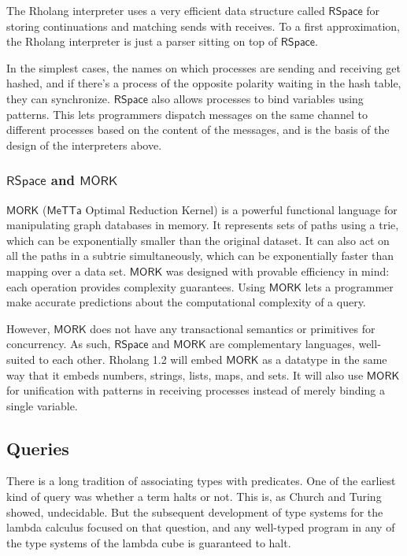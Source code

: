 \documentclass{article}
\newcommand{\RS}{\mathsf{RSpace}}
\begin{document}
The Rholang interpreter uses a very efficient data structure called $\RS$ for storing continuations and matching sends with receives.  To a first approximation, the Rholang interpreter is just a parser sitting on top of $\RS$.

In the simplest cases, the names on which processes are sending and receiving get hashed, and if there's a process of the opposite polarity waiting in the hash table, they can synchronize.  $\RS$ also allows processes to bind variables using patterns.  This lets programmers dispatch messages on the same channel to different processes based on the content of the messages, and is the basis of the design of the interpreters above.

\subsubsection{$\RS$ and $\mathsf{MORK}$}

$\mathsf{MORK}$ ($\mathsf{MeTTa}$ Optimal Reduction Kernel) is a powerful functional language for manipulating graph databases in memory. It represents sets of paths using a trie, which can be exponentially smaller than the original dataset.  It can also act on all the paths in a subtrie simultaneously, which can be exponentially faster than mapping over a data set.  $\mathsf{MORK}$ was designed with provable efficiency in mind: each operation provides complexity guarantees.  Using $\mathsf{MORK}$ lets a programmer make accurate predictions about the computational complexity of a query.

However, $\mathsf{MORK}$ does not have any transactional semantics or primitives for concurrency.  As such, $\RS$ and $\mathsf{MORK}$ are complementary languages, well-suited to each other.  Rholang 1.2 will embed $\mathsf{MORK}$ as a datatype in the same way that it embeds numbers, strings, lists, maps, and sets.  It will also use $\mathsf{MORK}$ for unification with patterns in receiving processes instead of merely binding a single variable.

\subsection{Queries}
\label{Queries}

There is a long tradition of associating types with predicates.  One of the earliest kind of query was whether a term halts or not.  This is, as Church and Turing showed, undecidable.  But the subsequent development of type systems for the lambda calculus focused on that question, and any well-typed program in any of the type systems of the lambda cube is guaranteed to halt.
\end{document}
